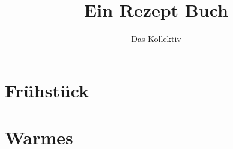 \documentclass[a4paper, 11pt]{article}
\begin{document}
    \title{Ein Rezept Buch}
    \author{Das Kollektiv}
    \maketitle
    \tableofcontents

    \vspace{5em}

    \section{Frühstück}

    
    
    
    \section{Warmes}
    
    
    


\end{document}
